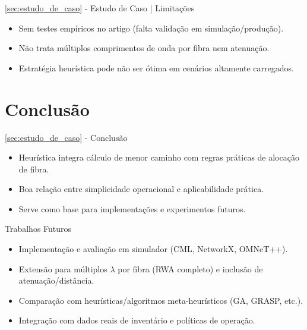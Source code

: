 \documentclass[aspectratio=169,xcolor=dvipsnames]{beamer}
\begin{document}
\begin{frame}{\ref{sec:estudo_de_caso} - Estudo de Caso | Limitações}
  \begin{itemize}
    \item Sem testes empíricos no artigo (falta validação em simulação/produção).
    \item Não trata múltiplos comprimentos de onda por fibra nem atenuação.
    \item Estratégia heurística pode não ser ótima em cenários altamente carregados.
  \end{itemize}
\end{frame}

\section{Conclusão}\label{sec:conclusao}
\begin{frame}{\ref{sec:estudo_de_caso} - Conclusão}
  \begin{itemize}
    \item Heurística integra cálculo de menor caminho com regras práticas de alocação de fibra.
    \item Boa relação entre simplicidade operacional e aplicabilidade prática.
    \item Serve como base para implementações e experimentos futuros.
  \end{itemize}
\end{frame}

\begin{frame}{Trabalhos Futuros}
  \begin{itemize}
    \item Implementação e avaliação em simulador (CML, NetworkX, OMNeT++).
    \item Extensão para múltiplos $\lambda$ por fibra (RWA completo) e inclusão de atenuação/distância.
    \item Comparação com heurísticas/algoritmos meta-heurísticos (GA, GRASP, etc.).
    \item Integração com dados reais de inventário e políticas de operação.
  \end{itemize}
\end{frame}
\end{document}
